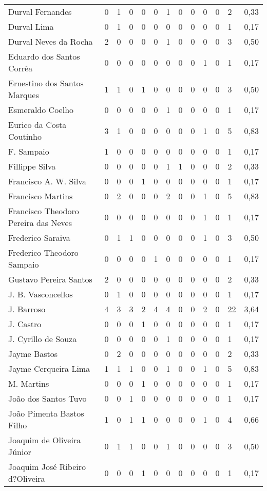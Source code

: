 \begin{table}[!htp]
{\begin{tiny}
\begin{tabular}{lllllllllllll}
Durval Fernandes	&0	&1	&0	&0	&0	&1	&0	&0	&0	&0	&2	&0,33\\
Durval Lima	&0	&1	&0	&0	&0	&0	&0	&0	&0	&0	&1	&0,17\\
Durval Neves da Rocha	&2	&0	&0	&0	&0	&1	&0	&0	&0	&0	&3	&0,50\\
Eduardo dos Santos Corrêa	&0	&0	&0	&0	&0	&0	&0	&0	&1	&0	&1	&0,17\\
Ernestino dos Santos Marques	&1	&1	&0	&1	&0	&0	&0	&0	&0	&0	&3	&0,50\\
Esmeraldo Coelho	&0	&0	&0	&0	&0	&1	&0	&0	&0	&0	&1	&0,17\\
Eurico da Costa Coutinho	&3	&1	&0	&0	&0	&0	&0	&0	&1	&0	&5	&0,83\\
F. Sampaio	&1	&0	&0	&0	&0	&0	&0	&0	&0	&0	&1	&0,17\\
Fillippe Silva	&0	&0	&0	&0	&0	&1	&1	&0	&0	&0	&2	&0,33\\
Francisco A. W. Silva	&0	&0	&0	&1	&0	&0	&0	&0	&0	&0	&1	&0,17\\
Francisco Martins	&0	&2	&0	&0	&0	&2	&0	&0	&1	&0	&5	&0,83\\
Francisco Theodoro Pereira das Neves	&0	&0	&0	&0	&0	&0	&0	&0	&1	&0	&1	&0,17\\
Frederico Saraiva	&0	&1	&1	&0	&0	&0	&0	&0	&1	&0	&3	&0,50\\
Frederico Theodoro Sampaio	&0	&0	&0	&0	&1	&0	&0	&0	&0	&0	&1	&0,17\\
Gustavo Pereira Santos	&2	&0	&0	&0	&0	&0	&0	&0	&0	&0	&2	&0,33\\
J. B. Vasconcellos	&0	&1	&0	&0	&0	&0	&0	&0	&0	&0	&1	&0,17\\
J. Barroso	&4	&3	&3	&2	&4	&4	&0	&0	&2	&0	&22	&3,64\\
J. Castro	&0	&0	&0	&1	&0	&0	&0	&0	&0	&0	&1	&0,17\\
J. Cyrillo de Souza	&0	&0	&0	&0	&0	&1	&0	&0	&0	&0	&1	&0,17\\
Jayme Bastos	&0	&2	&0	&0	&0	&0	&0	&0	&0	&0	&2	&0,33\\
Jayme Cerqueira Lima	&1	&1	&1	&0	&0	&1	&0	&0	&1	&0	&5	&0,83\\
M. Martins	&0	&0	&0	&1	&0	&0	&0	&0	&0	&0	&1	&0,17\\
João dos Santos Tuvo	&0	&0	&1	&0	&0	&0	&0	&0	&0	&0	&1	&0,17\\
João Pimenta Bastos Filho	&1	&0	&1	&1	&0	&0	&0	&0	&1	&0	&4	&0,66\\
Joaquim de Oliveira Júnior	&0	&1	&1	&0	&0	&1	&0	&0	&0	&0	&3	&0,50\\
Joaquim José Ribeiro d?Oliveira	&0	&0	&0	&1	&0	&0	&0	&0	&0	&0	&1	&0,17\\

\end{tabular}
\end{tiny}}
\end{table}

